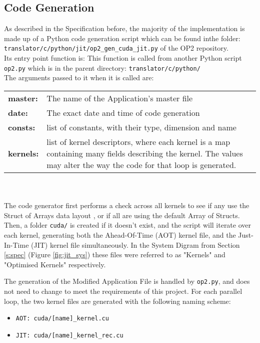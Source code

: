 \subsection{Code Generation}
\label{ss:codegen}
As described in the Specification before, the majority of the implementation is made up of a Python code generation script which can be found inthe folder: \verb|translator/c/python/jit/op2_gen_cuda_jit.py| of the OP2 repository.
\\
Its entry point function is:
This function is called from another Python script \verb|op2.py| which is in the parent directory: \verb|translator/c/python/|\\
The arguments passed to it when it is called are:\\
\begin{tabular}{>{\bfseries}l l}
  master: & The name of the Application's master file \\
  date: & The exact date and time of code generation \\
  consts: & list of constants, with their type, dimension and name \\
  kernels: & \parbox[t]{.8\textwidth}{list of kernel descriptors, where each kernel is a map containing many fields describing the kernel. The values may alter the way the code for that loop is generated.}
\end{tabular}
\\
\\
The code generator first performs a check across all kernels to see if any use the Struct of Arrays data layout \cite[p13]{manual}, or if all are using the default Array of Structs. Then, a folder \verb|cuda/| is created if it doesn't exist, and the script will iterate over each kernel, generating both the Ahead-Of-Time (AOT) kernel file, and the Just-In-Time (JIT) kernel file simultaneously. In the System Digram from Section \ref{s:spec} (Figure \ref{fig:jit_sys}) these files were referred to as "Kernels" and "Optimised Kernels" respectively. \par
The generation of the Modified Application File is handled by \verb|op2.py|, and does not need to change to meet the requirements of this project.
\clearpage For each parallel loop, the two kernel files are generated with the following naming scheme:
\begin{itemize}
\vspace{-1em}
\item{\verb|AOT: cuda/[name]_kernel.cu|}
\vspace{-1em}
\item{\verb|JIT: cuda/[name]_kernel_rec.cu|}
\end{itemize}


